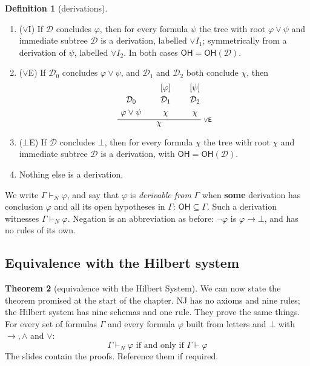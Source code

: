 \documentclass[a4paper, 11pt]{article}
\theoremstyle{definition}
\newtheorem{definition}{Definition}[section]
\newtheorem{theorem}[definition]{Theorem}
\begin{document}
\begin{definition}[derivations]
\begin{enumerate}
\[            \UnaryInfC{$\varphi$}
            \DisplayProof
            \qquad \text{and} \qquad
            \AxiomC{$\mathcal{D}$}
            \noLine
            \UnaryInfC{$\varphi \land \psi$}
            \RightLabel{\scriptsize $\land\mathsf{E}_2$}
            \UnaryInfC{$\psi$}
            \DisplayProof
        \] 
        \item ($\lor$I) If $\mathcal{D}$ concludes $\varphi$, then for every formula $\psi$ the tree with root $\varphi
        \lor \psi$ and immediate subtree $\mathcal{D}$ is a derivation, labelled $\lor I_1$; symmetrically from a
        derivation of $\psi$, labelled $\lor I_2$. In both cases $\mathsf{OH} = \mathsf{OH}(\mathcal{D})$.
        \item ($\lor$E) If $\mathcal{D}_0$ concludes $\varphi \lor \psi$, and $\mathcal{D}_1$ and $\mathcal{D}_2$ both
        conclude $\chi$, then
        \[
            \AxiomC{$\mathcal{D}_0$}
            \noLine
            \UnaryInfC{$\varphi \lor \psi\strut$}
            \AxiomC{$[\varphi]$}
            \noLine
            \UnaryInfC{$\mathcal{D}_1$}
            \noLine
            \UnaryInfC{$\chi\strut$}
            \AxiomC{$[\psi]$}
            \noLine
            \UnaryInfC{$\mathcal{D}_2$}
            \noLine
            \UnaryInfC{$\chi\strut$}
            \RightLabel{\scriptsize $\lor\mathsf{E}$}
            \TrinaryInfC{$\chi$}
            \DisplayProof
        \]
        \item ($\bot$E) If $\mathcal{D}$ concludes $\bot$, then for every formula $\chi$ the tree with root $\chi$ and
        immediate subtree $\mathcal{D}$ is a derivation, with $\mathsf{OH} = \mathsf{OH}(\mathcal{D})$.
        \item Nothing else is a derivation.
    \end{enumerate}

    We write $\Gamma \vdash_N \varphi$, and say that $\varphi$ is \textit{derivable from} $\Gamma$ when \textbf{some}
    derivation has conclusion $\varphi$ and all its open hypotheses in $\Gamma$: $\mathsf{OH} \subseteq \Gamma$. Such a
    derivation witnesses $\Gamma \vdash_N \varphi$. Negation is an abbreviation as before: $\neg \varphi$ is $\varphi
    \to \bot$, and has no rules of its own.
\end{definition}

\subsection{Equivalence with the Hilbert system}
\begin{theorem}[equivalence with the Hilbert System]
    We can now state the theorem promised at the start of the chapter. NJ has no axioms and nine rules; the Hilbert
    system has nine schemas and one rule. They prove the same things.
    \\
    For every set of formulas $\Gamma$ and every formula $\varphi$ built from letters and $\bot$ with $\to, \land$ and
    $\lor$:
    \[
        \Gamma \vdash_N \varphi \text{ if and only if } \Gamma \vdash \varphi 
    \]
    The slides contain the proofs. Reference them if required.
\end{theorem}
\end{document}

